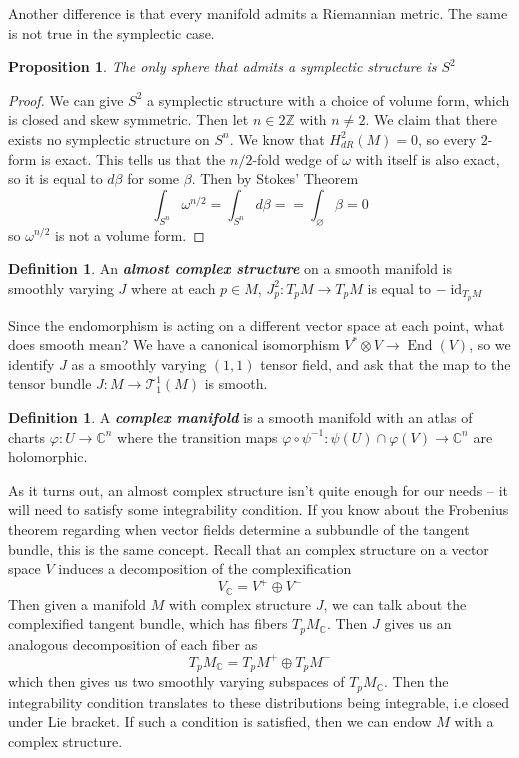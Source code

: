 \documentclass[psamsfonts]{amsart}
\newtheorem{prop}[thm]{Proposition}
\theoremstyle{definition}
\newtheorem{defn}[thm]{Definition}
\theoremstyle{remark}
\renewcommand{\emptyset}{\varnothing}
\newcommand{\ib}[1]{\textbf{\textit{#1}}}
\newcommand{\Z}{\mathbb{Z}}
\newcommand{\C}{\mathbb{C}}
\newcommand{\inv}{^{-1}}
\DeclareMathOperator{\id}{id}
\DeclareMathOperator{\End}{End}
\begin{document}
Another difference is that every manifold admits a Riemannian metric. The same is not true in the symplectic case. 
\begin{prop}
The only sphere that admits a symplectic structure is $S^2$
\end{prop}
%
\begin{proof}
We can give $S^2$ a symplectic structure with a choice of volume form, which is closed and skew symmetric. Then let $n \in 2\Z$ with $n \neq 2$. We claim that there exists no symplectic structure on $S^n$. We know that $H^2_{dR}(M) = 0$, so every $2$-form is exact. This tells us that the $n/2$-fold wedge of $\omega$ with itself is also exact, so it is equal to $d\beta$ for some $\beta$. Then by Stokes' Theorem
$$\int_{S^n} \omega^{n/2} = \int_{S^n} d\beta = = \int_\emptyset \beta = 0 $$
so $\omega^{n/2}$ is not a volume form.
\end{proof}
%
\begin{defn}
An \ib{almost complex structure} on a smooth manifold is smoothly varying $J$ where at each $p \in M$, $J_p^2: T_pM \to T_pM$ is equal to $-\id_{T_pM}$
\end{defn}
Since the endomorphism is acting on a different vector space at each point, what does smooth mean? We have a canonical isomorphism $V^* \otimes V \to \End(V)$, so we identify $J$ as a smoothly varying $(1,1)$ tensor field, and ask that the map to the tensor bundle $J: M \to \mathcal{T}^1_1(M)$ is smooth.
%
\begin{defn}
A \ib{complex manifold} is a smooth manifold with an atlas of charts $\varphi: U \to \C^n$ where the transition maps $\varphi \circ \psi\inv : \psi(U) \cap \varphi(V) \to \C^n$ are holomorphic.
\end{defn}
%
As it turns out, an almost complex structure isn't quite enough for our needs -- it will need to satisfy some integrability condition. If you know about the Frobenius theorem regarding when vector fields determine a subbundle of the tangent bundle, this is the same concept. Recall that an complex structure on a vector space $V$ induces a decomposition of the complexification
$$V_\C = V^+ \oplus V^- $$
Then given a manifold $M$ with complex structure $J$, we can talk about the complexified tangent bundle, which has fibers $T_pM_\C$. Then $J$ gives us an analogous decomposition of each fiber as
$$T_pM_\C = T_pM^+ \oplus T_pM^- $$
which then gives us two smoothly varying subspaces of $T_pM_\C$. Then the integrability condition translates to these distributions being integrable, i.e closed under Lie bracket. If such a condition is satisfied, then we can endow $M$ with a complex structure.
\end{document}
